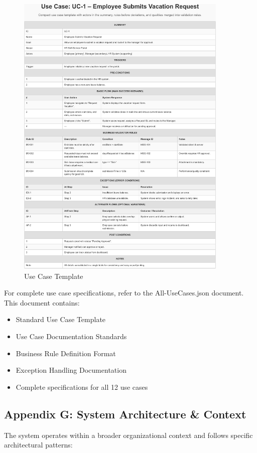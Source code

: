 \documentclass[12pt,a4paper]{article}
\begin{document}
\begin{figure}[H]
\centering
\includegraphics[width=0.9\textwidth]{Use-Cases/Use-Case-Template/Use-Case-Template-1.png}
\caption{Use Case Template}
\label{fig:use-case-template}
\end{figure}

For complete use case specifications, refer to the All-UseCases.json document. This document contains:

\begin{itemize}
    \item Standard Use Case Template
    \item Use Case Documentation Standards
    \item Business Rule Definition Format
    \item Exception Handling Documentation
    \item Complete specifications for all 12 use cases
\end{itemize}

\subsection{Appendix G: System Architecture \& Context}
The system operates within a broader organizational context and follows specific architectural patterns:
\end{document}
